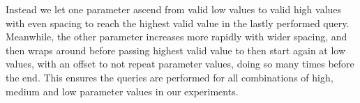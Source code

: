 Instead we let one parameter ascend from valid low values to valid high values with even spacing to reach the highest valid value in the lastly performed query. Meanwhile, the other parameter increases more rapidly with wider spacing, and then wraps around before passing highest valid value to then start again at low values, with an offset to not repeat parameter values, doing so many times before the end.
This ensures the queries are performed for all combinations of high, medium and low parameter values in our experiments.

